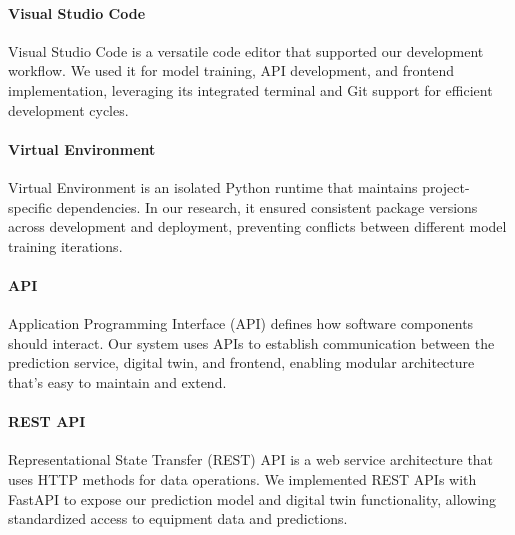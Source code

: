 \paragraph{Visual Studio Code} Visual Studio Code is a versatile code editor that supported our development workflow. We used it for model training, API development, and frontend implementation, leveraging its integrated terminal and Git support for efficient development cycles.

\paragraph{Virtual Environment} Virtual Environment is an isolated Python runtime that maintains project-specific dependencies. In our research, it ensured consistent package versions across development and deployment, preventing conflicts between different model training iterations.

\paragraph{API} Application Programming Interface (API) defines how software components should interact. Our system uses APIs to establish communication between the prediction service, digital twin, and frontend, enabling modular architecture that's easy to maintain and extend.

\paragraph{REST API} Representational State Transfer (REST) API is a web service architecture that uses HTTP methods for data operations. We implemented REST APIs with FastAPI to expose our prediction model and digital twin functionality, allowing standardized access to equipment data and predictions.